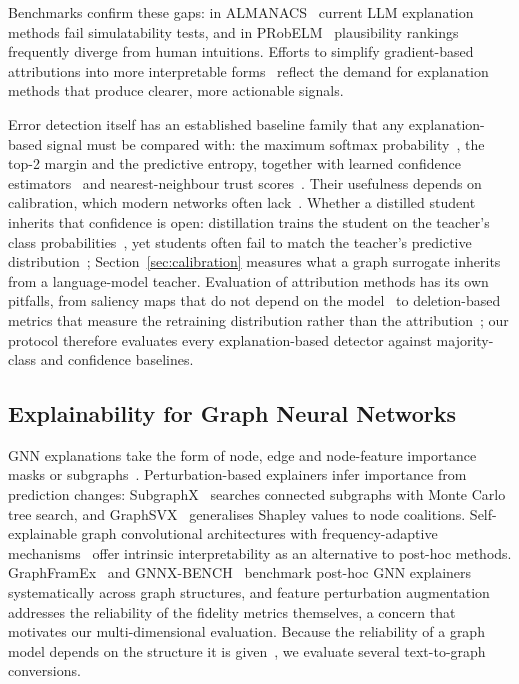 Benchmarks confirm these gaps: in ALMANACS~\cite{mills2025almanacssimulatabilitybenchmarklanguage} current LLM explanation methods fail simulatability tests, and in PRobELM~\cite{yuan2025probelmplausibilityrankingevaluation} plausibility rankings frequently diverge from human intuitions. Efforts to simplify gradient-based attributions into more interpretable forms~\cite{rodrigues2024gad} reflect the demand for explanation methods that produce clearer, more actionable signals.

Error detection itself has an established baseline family that any explanation-based signal must be compared with: the maximum softmax probability~\cite{hendrycks2017baseline}, the top-2 margin and the predictive entropy, together with learned confidence estimators~\cite{corbiere2019confidnet} and nearest-neighbour trust scores~\cite{jiang2018trust}. Their usefulness depends on calibration, which modern networks often lack~\cite{guo2017calibration}. Whether a distilled student inherits that confidence is open: distillation trains the student on the teacher's class probabilities~\cite{gou2021kd}, yet students often fail to match the teacher's predictive distribution~\cite{stanton2021kd}; Section~\ref{sec:calibration} measures what a graph surrogate inherits from a language-model teacher. Evaluation of attribution methods has its own pitfalls, from saliency maps that do not depend on the model~\cite{adebayo2018sanity} to deletion-based metrics that measure the retraining distribution rather than the attribution~\cite{hooker2019roar}; our protocol therefore evaluates every explanation-based detector against majority-class and confidence baselines.

\subsection{Explainability for Graph Neural Networks} \label{explainability_graphs}

GNN explanations take the form of node, edge and node-feature importance masks or subgraphs~\cite{agarwal2023graphxai}. Perturbation-based explainers infer importance from prediction changes: SubgraphX~\cite{yuan2021explainabilitygraphneuralnetworks} searches connected subgraphs with Monte Carlo tree search, and GraphSVX~\cite{duval2021graphsvxshapleyvalueexplanations} generalises Shapley values to node coalitions. Self-explainable graph convolutional architectures with frequency-adaptive mechanisms~\cite{wei2024selfexplainable} offer intrinsic interpretability as an alternative to post-hoc methods. GraphFramEx~\cite{amara2022graphframex} and GNNX-BENCH~\cite{kosan2024gnnxbenchunravellingutilityperturbationbased} benchmark post-hoc GNN explainers systematically across graph structures, and feature perturbation augmentation~\cite{brocki2023fpa} addresses the reliability of the fidelity metrics themselves, a concern that motivates our multi-dimensional evaluation. Because the reliability of a graph model depends on the structure it is given~\cite{xue2025llm-gnn-xai}, we evaluate several text-to-graph conversions.

